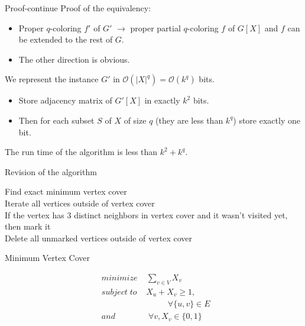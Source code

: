 \documentclass{beamer}
\begin{document}
\begin{frame}{Proof-continue}
Proof of the equivalency: 
\begin{itemize}

\item Proper $q$-coloring $f'$ of $G'$ $\longrightarrow$ proper partial $q$-coloring $f$ of $G[X]$ 
and $f$ can be extended to the rest of $G$.

\item The other direction is obvious.


\end{itemize}
We represent the instance $G'$ in $\mathcal{O}(|X|^q) = \mathcal{O}(k^q)$ bits.
\begin{itemize}
\item Store adjacency matrix of $G'[X]$ in exactly $k^2$ bits. 

\item Then for each subset $S$ of $X$ of size $q$ (they are less than $k^q$) store exactly one bit. 
\end{itemize}
The run time of the algorithm is less than $k^2 + k^q$.
\end{frame}
\begin{frame}{Revision of the algorithm}

\begin{algorithm}[H]
\begin{algorithmic}[1]
\SetAlgoLined
\DontPrintSemicolon
  \caption{Kernelization of vertex coloring by using vertex cover}

\STATE Find exact minimum vertex cover\\

\STATE Iterate all vertices outside of vertex cover\\

\STATE If the vertex has $3$ distinct neighbors in vertex cover and it wasn't
visited yet, then mark it\\

\STATE Delete all unmarked vertices outside of vertex cover\\
\end{algorithmic}
\end{algorithm}
\end{frame}


\begin{frame}{Minimum Vertex Cover}

\begin{align*}
&minimize \; \;\; \; \sum_{v\in V}X_v \\
&subject\; to \;\;\; \; X_u + X_v  \geq 1 , \qquad \\
&\qquad 	\qquad\qquad\qquad	 \forall \{u,v\} \in E\\
&and	\qquad\qquad	 \forall v, X_v\in \{0,1\}
\end{align*}
\end{frame}
\end{document}
